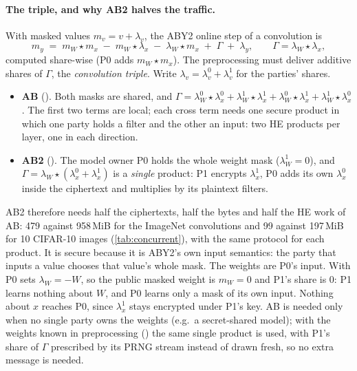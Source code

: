 \paragraph{The triple, and why AB2 halves the traffic.} With masked values $m_v = v + \lambda_v$, the
ABY2 online step of a convolution is
\[
  m_y \;=\; m_W \star m_x \;-\; m_W \star \lambda_x \;-\; \lambda_W \star m_x \;+\; \Gamma \;+\; \lambda_y,
  \qquad \Gamma = \lambda_W \star \lambda_x ,
\]
computed share-wise (P0 adds $m_W \star m_x$). The preprocessing must deliver additive shares of $\Gamma$, the
\emph{convolution triple}. Write $\lambda_v = \lambda_v^0 + \lambda_v^1$ for the parties' shares.
\begin{itemize}\itemsep1pt
\item \textbf{AB} (). Both masks are shared, and
  $\Gamma = \lambda_W^0 \star \lambda_x^0 + \lambda_W^1 \star \lambda_x^1 + \lambda_W^0 \star \lambda_x^1 + \lambda_W^1 \star \lambda_x^0$.
  The first two terms are local; each cross term needs one secure product in which one party holds a filter and
  the other an input: two HE products per layer, one in each direction.
\item \textbf{AB2} (). The model owner P0 holds the whole weight mask ($\lambda_W^1 = 0$), and
  $\Gamma = \lambda_W \star (\lambda_x^0 + \lambda_x^1)$ is a \emph{single} product: P1 encrypts $\lambda_x^1$,
  P0 adds its own $\lambda_x^0$ inside the ciphertext and multiplies by its plaintext filters.
\end{itemize}
AB2 therefore needs half the ciphertexts, half the bytes and half the HE work of AB: 479 against 958\,MiB for
the ImageNet convolutions and 99 against 197\,MiB for 10 CIFAR-10 images (\cref{tab:concurrent}), with the same
protocol for each product.
It is secure because it is ABY2's own input semantics: the party that inputs a value chooses that value's whole
mask. The weights are P0's input. With  P0 sets $\lambda_W = -W$, so the public masked
weight is $m_W = 0$ and P1's share is 0: P1 learns nothing about $W$, and P0 learns only a mask of its own input.
Nothing about $x$ reaches P0, since $\lambda_x^1$ stays encrypted under P1's key. AB is needed only when no single
party owns the weights (e.g.\ a secret-shared model); with the weights known in preprocessing
() the same single product is used, with P1's share of $\Gamma$
prescribed by its PRNG stream instead of drawn fresh, so no extra message is needed.

